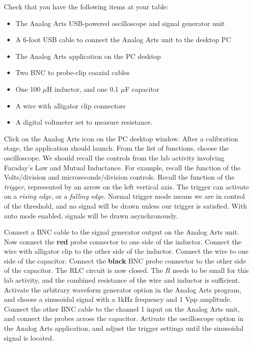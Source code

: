 \documentclass[12pt,twocolumn]{article}
\begin{document}
\noindent
Check that you have the following items at your table:
\begin{itemize}
\item The Analog Arts USB-powered oscilloscope and signal generator unit
\item A 6-foot USB cable to connect the Analog Arts unit to the desktop PC
\item The Analog Arts application on the PC desktop
\item Two BNC to probe-clip coaxial cables
\item One 100 $\mu$H inductor, and one 0.1 $\mu$F capacitor
\item A wire with alligator clip connectors
\item A digital voltmeter set to measure resistance.
\end{itemize}

Click on the Analog Arts icon on the PC desktop window.  After a calibration stage, the application should launch.  From the list of functions, choose the oscilloscope.  We should recall the controls from the lab activity involving Faraday's Law and Mutual Inductance.  For example, recall the function of the Volts/division and microseconds/division controls.  Recall the function of the \textit{trigger}, represented by an arrow on the left vertical axis.  The trigger can activate on a \textit{rising edge}, or a \textit{falling edge.}  Normal trigger mode means we are in control of the threshold, and no signal will be drawn unless our trigger is satisfied.  With auto mode enabled, signals will be drawn asynchronously.

Connect a BNC cable to the signal generator output on the Analog Arts unit.  Now connect the \textbf{red} probe connector to one side of the inductor.  Connect the wire with alligator clip to the other side of the inductor.  Connect the wire to one side of the capacitor.  Connect the \textbf{black} BNC probe connector to the other side of the capacitor.  The RLC circuit is now closed.  The $R$ needs to be small for this lab activity, and the combined resistance of the wire and inductor is sufficient.  Activate the arbitrary waveform generator option in the Analog Arts program, and choose a sinusoidal signal with a 1kHz frequency and 1 Vpp amplitude.   Connect the other BNC cable to the channel 1 input on the Analog Arts unit, and connect the probes across the capacitor.  Activate the oscilloscope option in the Analog Arts application, and adjust the trigger settings until the sinusoidal signal is located.
\end{document}
